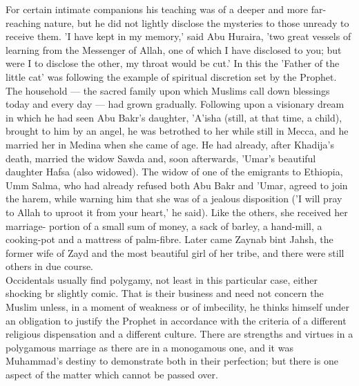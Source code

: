 \documentclass[10pt, twoside]{book}
\begin{document}
For certain intimate companions his teaching was of a deeper and more far\hyp{}reaching nature, but he did 
not lightly disclose the mysteries to those unready to receive them. 'I have kept in my memory,' said 
Abu Huraira, 'two great vessels of learning from the Messenger of Allah, one of which I have 
disclosed to you; but were I to disclose the other, my throat would be cut.' In this the 'Father of 
the little cat' was following the example of spiritual discretion set by the Prophet. \\

The household --- the sacred family upon which Muslims call down blessings today and every day --- had 
grown gradually. Following upon a visionary dream in which he had seen Abu Bakr's daughter, 'A'isha 
(still, at that time, a child), brought to him by an angel, he was betrothed to her while still in 
Mecca, and he married her in Medina when she came of age. He had already, after Khadija's death, 
married the widow Sawda and, soon afterwards, 'Umar's beautiful daughter Hafsa (also widowed). The 
widow of one of the emigrants to Ethiopia, Umm Salma, who had already refused both Abu Bakr and 
'Umar, agreed to join the harem, while warning him that she was of a jealous disposition ('I will 
pray to Allah to uproot it from your heart,' he said). Like the others, she received her marriage\hyp{}
portion of a small sum of money, a sack of barley, a hand\hyp{}mill, a cooking\hyp{}pot and a mattress of 
palm\hyp{}fibre. Later came Zaynab bint Jahsh, the former wife of Zayd and the most beautiful girl of her 
tribe, and there were still others in due course. \\

Occidentals usually find polygamy, not least in this particular case, either shocking br slightly 
comic. That is their business and need not concern the Muslim unless, in a moment of weakness or of 
imbecility, he thinks himself under an obligation to justify the Prophet in accordance with the 
criteria of a different religious dispensation and a different culture. There are strengths and 
virtues in a polygamous marriage as there are in a monogamous one, and it was Muhammad's destiny to 
demonstrate both in their perfection; but there is one aspect of the matter which cannot be passed 
over. \\
\end{document}
